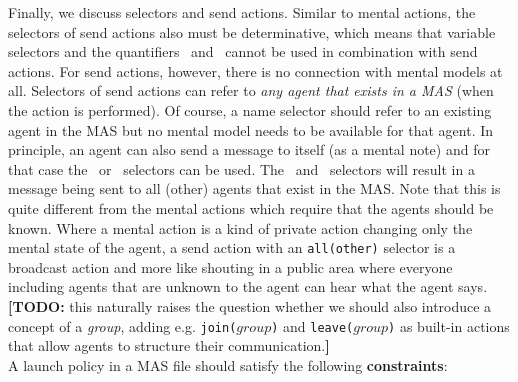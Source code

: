 \documentclass{article}
\newcommand{\todo}[1]{\textbf{[TODO: }#1\textbf{]}}
\begin{document}
Finally, we discuss selectors and send actions. Similar to mental actions, the selectors of send actions also must be determinative, which means that variable selectors and the quantifiers \somep\, and \someother\, cannot be used in combination with send actions. For send actions, however, there is no connection with mental models at all. Selectors of send actions can refer to \textit{any agent that exists in a MAS} (when the action is performed). Of course, a name selector should refer to an existing agent in the MAS but no mental model needs to be available for that agent. In principle, an agent can also send a message to itself (as a mental note) and for that case the \self\, or \this\, selectors can be used. The \allp\, and \allother\, selectors will result in a message being sent to all (other) agents that exist in the MAS. Note that this is quite different from the mental actions which require that the agents should be known. Where a mental action is a kind of private action changing only the mental state of the agent, a send action with an \texttt{all(other)} selector is a broadcast action and more like shouting in a public area where everyone including agents that are unknown to the agent can hear what the agent says. \todo{this naturally raises the question whether we should also introduce a concept of a \textit{group}, adding e.g. \texttt{join($group$)} and \texttt{leave($group$)} as built-in actions that allow agents to structure their communication.}
\\[2ex]
\noindent
A launch policy in a MAS file should satisfy the following \textbf{constraints}:
\end{document}
